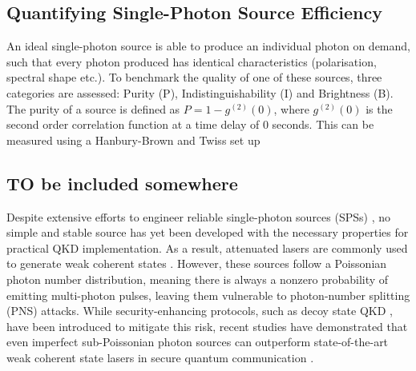 \subsection{Quantifying Single-Photon Source Efficiency}

An ideal single-photon source is able to produce an individual photon on demand, such that every photon produced has identical characteristics (polarisation, spectral shape etc.). To benchmark the quality of one of these sources, three categories are assessed: Purity (P), Indistinguishability (I) and Brightness (B). The purity of a source is defined as $P=1-g^{(2)}(0)$, where $g^{(2)}(0)$ is the second order correlation function at a time delay of 0 seconds. This can be measured using a Hanbury-Brown and Twiss set up 




\subsection{TO be included somewhere}


Despite extensive efforts to engineer reliable single-photon sources (SPSs) \cite{Eisaman2011}, no simple and stable source has yet been developed with the necessary properties for practical QKD implementation. As a result, attenuated lasers are commonly used to generate weak coherent states \cite{Stucki2005}. However, these sources follow a Poissonian photon number distribution, meaning there is always a nonzero probability of emitting multi-photon pulses, leaving them vulnerable to photon-number splitting (PNS) attacks. While security-enhancing protocols, such as decoy state QKD \cite{Lo2005}, have been introduced to mitigate this risk, recent studies have demonstrated that even imperfect sub-Poissonian photon sources can outperform state-of-the-art weak coherent state lasers in secure quantum communication \cite{Ordan2024}.

